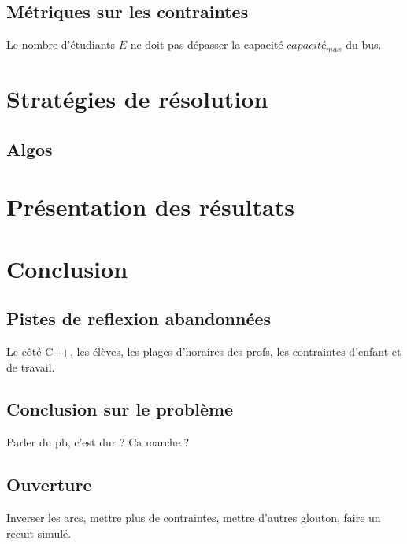 \documentclass[a4paper,11pt]{article}
\begin{document}
	\subsection{Métriques sur les contraintes}
		Le nombre d'étudiants $E$ ne doit pas dépasser la capacité $capacité_{max}$ du bus.
	
\section{Stratégies de résolution}
\subsection{Algos}

\section{Présentation des résultats}

\section{Conclusion}
	\subsection{Pistes de reflexion abandonnées}
		Le côté C++, les élèves, les plages d'horaires des profs, les contraintes d'enfant et de travail.
	\subsection{Conclusion sur le problème}
		Parler du pb, c'est dur ? Ca marche ?
	\subsection{Ouverture}
		Inverser les arcs, mettre plus de contraintes, mettre d'autres glouton, faire un recuit simulé.
\end{document}
